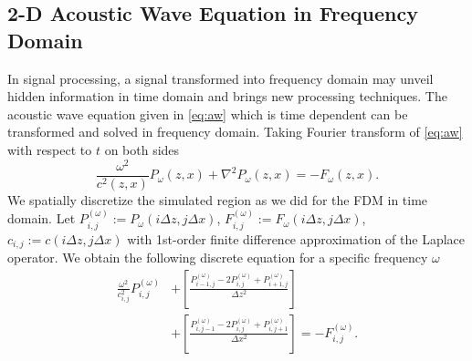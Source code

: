 \documentclass[11pt]{article}
\theoremstyle{plain}
\theoremstyle{definition}
\theoremstyle{remark}
\numberwithin{equation}{section}
\begin{document}
\subsection{2-D Acoustic Wave Equation in Frequency Domain}
In signal processing, a signal transformed into frequency domain may unveil hidden information in time domain and brings new processing
techniques. The acoustic wave equation given in \eqref{eq:aw} which is time dependent can be transformed and solved in frequency domain. 
Taking Fourier transform of \eqref{eq:aw} with respect to $t$ on both sides
  \begin{equation}
  \frac{\omega^2}{c^2(z, x)}P_{\omega}(z, x) + \nabla^2 P_{\omega}(z, x) =- F_{\omega}(z, x).
  \end{equation}
  We spatially discretize the simulated region as we did for the FDM in time domain.  
  Let $P_{i,j}^{(\omega)} := P_{\omega}(i\Delta z, j\Delta x)$, $F_{i,j}^{(\omega)} := 
  F_{\omega}(i\Delta z, j\Delta x)$, $c_{i,j} := c(i\Delta z, j\Delta x)$  with 1st-order finite difference approximation of the Laplace operator.
  We obtain the following discrete equation for a specific frequency $\omega$
  \begin{equation}
  \begin{aligned}
  \frac{\omega^2}{c_{i,j}^2} P_{i,j}^{(\omega)} &+\left[ \frac{P_{i-1,j}^{(\omega)} - 2P_{i,j}^{(\omega)} + P_{i+1,j}^{(\omega)}}{\Delta z^2} \right] \\&+\left[ \frac{P_{i,j-1}^{(\omega)} - 2P_{i,j}^{(\omega)} + P_{i,j+1}^{(\omega)}}{\Delta x^2} \right] =- F_{i,j}^{(\omega)}.
  \end{aligned}
  \end{equation}
  
\end{document}
